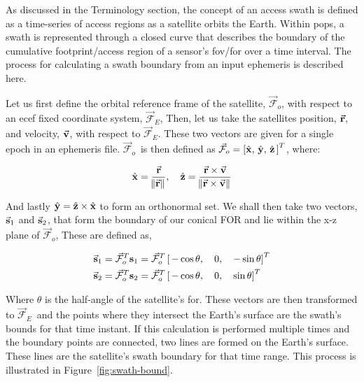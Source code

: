 As discussed in the Terminology section, the concept of an access swath is
defined as a time-series of access regions as a satellite orbits the Earth.
Within \gls{pops}, a swath is represented through a closed curve that describes
the boundary of the cumulative footprint/access region of a sensor’s
\gls{fov}/\gls{for} over a time interval. The process for calculating a swath
boundary from an input ephemeris is described here.  

\newcommand{\Fo}{$\vec{\mathcal{F}}_o$} 
\newcommand{\Fe}{$\vec{\mathcal{F}}_E$}

Let us first define the orbital reference frame of the satellite, \Fo, with
respect to an \gls{ecef} fixed coordinate system, \Fe,  Then, let us take the
satellites position, $\vec{\bm{\mathrm{r}}}$, and velocity, $\vec{\bm{\mathrm{v}}}$, with respect to \Fe.
These two vectors are given for a single epoch in an ephemeris file.  \Fo ~is
then defined as $ \vec{\mathcal{F}}_o = \left[ \hat{\bm{\mathrm{x}}}, \, \hat{\bm{\mathrm{y}}}, \, \hat{\bm{\mathrm{z}}}
\, \right]^T$, where:

\begin{equation} 
    \hat{\bm{\mathrm{x}}} = \frac{\vec{\bm{\mathrm{r}}}}{\norm{\vec{\bm{\mathrm{r}}}}}, 
    \quad 
    \hat{\bm{\mathrm{z}}} = \frac{\vec{\bm{\mathrm{r}}}\times\vec{\bm{\mathrm{v}}}}{\norm{\vec{\bm{\mathrm{r}}}\times\vec{\bm{\mathrm{v}}}}}
\end{equation}

And lastly $\hat{\bm{\mathrm{y}}} = \hat{\bm{\mathrm{z}}} \times \hat{\bm{\mathrm{x}}}$ to form an orthonormal set. We
shall then take two vectors, $\vec{\bm{\mathrm{s}}}_{1}$ and $\vec{\bm{\mathrm{s}}}_{2}$, that form the
boundary of our conical FOR and lie within the x-z plane of \Fo,  These are
defined as,

\begin{align}
    \vec{\bm{\mathrm{s}}}_{1} &= \vec{\mathcal{F}}_o^T\bm{\mathrm{s}}_{1} = \vec{\mathcal{F}}_o^T \left[ \, -\cos\theta, \quad 0, \quad -\sin\theta \right]^T \\
    \vec{\bm{\mathrm{s}}}_{2} &= \vec{\mathcal{F}}_o^T\bm{\mathrm{s}}_{2} = \vec{\mathcal{F}}_o^T \left[ \, -\cos\theta, \quad 0, \quad \sin\theta \right]^T
\end{align}

Where $\theta$ is the half-angle of the satellite’s \gls{for}. These vectors
are then transformed to \Fe~and the points where they intersect the Earth’s
surface are the swath’s bounds for that time instant. If this calculation is
performed multiple times and the boundary points are connected, two lines are
formed on the Earth’s surface. These lines are the satellite’s swath boundary
for that time range.  This process is illustrated in
Figure~\ref{fig:swath-bound}.

%


